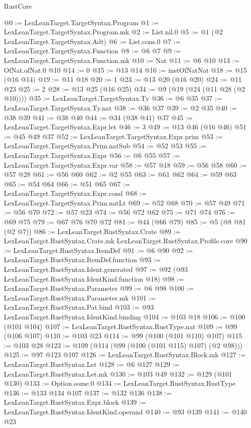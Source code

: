 \begin{lexlean}{RustCore}
\begin{coremodule}
@0 := LexLeanTarget.TargetSyntax.Program
@1 := LexLeanTarget.TargetSyntax.Program.mk
@2 := List.nil.{0}
@5 := @1 (@2 LexLeanTarget.TargetSyntax.Adt)
@6 := List.cons.{0}
@7 := LexLeanTarget.TargetSyntax.Function
@8 := @6 @7
@9 := LexLeanTarget.TargetSyntax.Function.mk
@10 := Nat
@11 := @6 @10
@13 := OfNat.ofNat.{0} @10
@14 := 0
@15 := @13 @14
@16 := instOfNatNat
@18 := @15 (@16 @14)
@19 := @11 @18
@20 := 1
@23 := @13 @20 (@16 @20)
@24 := @11 @23
@25 := 2
@28 := @13 @25 (@16 @25)
@34 := @9 (@19 (@24 (@11 @28 (@2 @10))))
@35 := LexLeanTarget.TargetSyntax.Ty
@36 := @6 @35
@37 := LexLeanTarget.TargetSyntax.Ty.nat
@38 := @36 @37
@39 := @2 @35
@40 := @38 @39
@41 := @38 @40
@44 := @34 (@38 @41) @37
@45 := LexLeanTarget.TargetSyntax.Expr.let
@46 := 3
@49 := @13 @46 (@16 @46)
@51 := @45 @49 @37
@52 := LexLeanTarget.TargetSyntax.Expr.prim
@53 := LexLeanTarget.TargetSyntax.Prim.natSub
@54 := @52 @53
@55 := LexLeanTarget.TargetSyntax.Expr
@56 := @6 @55
@57 := LexLeanTarget.TargetSyntax.Expr.var
@58 := @57 @18
@59 := @56 @58
@60 := @57 @28
@61 := @56 @60
@62 := @2 @55
@63 := @61 @62
@64 := @59 @63
@65 := @54 @64
@66 := @51 @65
@67 := LexLeanTarget.TargetSyntax.Expr.cond
@68 := LexLeanTarget.TargetSyntax.Prim.natLt
@69 := @52 @68
@70 := @57 @49
@71 := @56 @70
@72 := @57 @23
@74 := @56 @72 @62
@75 := @71 @74
@76 := @69 @75
@79 := @67 @76 @70 @72
@81 := @44 (@66 @79)
@85 := @5 (@8 @81 (@2 @7))
@86 := LexLeanTarget.RustSyntax.Crate
@89 := LexLeanTarget.RustSyntax.Crate.mk LexLeanTarget.RustSyntax.Profile.core
@90 := LexLeanTarget.RustSyntax.ItemDef
@91 := @6 @90
@92 := LexLeanTarget.RustSyntax.ItemDef.function
@93 := LexLeanTarget.RustSyntax.Ident.generated
@97 := @92 (@93 LexLeanTarget.RustSyntax.IdentKind.function @18)
@98 := LexLeanTarget.RustSyntax.Parameter
@99 := @6 @98
@100 := LexLeanTarget.RustSyntax.Parameter.mk
@101 := LexLeanTarget.RustSyntax.Pat.bind
@103 := @93 LexLeanTarget.RustSyntax.IdentKind.binding
@104 := @103 @18
@106 := @100 (@101 @104)
@107 := LexLeanTarget.RustSyntax.RustType.nat
@109 := @99 (@106 @107)
@110 := @103 @23
@114 := @99 (@100 (@101 @110) @107)
@115 := @103 @28
@123 := @109 (@114 (@99 (@100 (@101 @115) @107) (@2 @98)))
@125 := @97 @123 @107
@126 := LexLeanTarget.RustSyntax.Block.mk
@127 := LexLeanTarget.RustSyntax.Let
@128 := @6 @127
@129 := LexLeanTarget.RustSyntax.Let.mk
@130 := @103 @49
@132 := @129 (@101 @130)
@133 := Option.some.{0}
@134 := LexLeanTarget.RustSyntax.RustType
@136 := @133 @134 @107
@137 := @132 @136
@138 := LexLeanTarget.RustSyntax.Expr.block
@139 := LexLeanTarget.RustSyntax.IdentKind.operand
@140 := @93 @139
@141 := @140 @23

\end{coremodule}
\end{lexlean}
